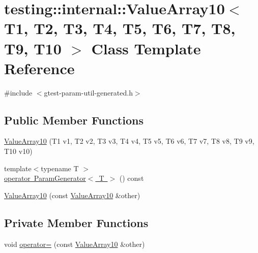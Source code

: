 \hypertarget{classtesting_1_1internal_1_1_value_array10}{}\section{testing\+::internal\+::Value\+Array10$<$ T1, T2, T3, T4, T5, T6, T7, T8, T9, T10 $>$ Class Template Reference}
\label{classtesting_1_1internal_1_1_value_array10}


{\ttfamily \#include $<$gtest-\/param-\/util-\/generated.\+h$>$}

\subsection*{Public Member Functions}
\begin{DoxyCompactItemize}
\item 
\mbox{\hyperlink{classtesting_1_1internal_1_1_value_array10_a763527165bcd1d8e7c366f979b76736b}{Value\+Array10}} (T1 v1, T2 v2, T3 v3, T4 v4, T5 v5, T6 v6, T7 v7, T8 v8, T9 v9, T10 v10)
\item 
{\footnotesize template$<$typename T $>$ }\\\mbox{\hyperlink{classtesting_1_1internal_1_1_value_array10_afa8855c713997ae82781159f3a3d53fc}{operator Param\+Generator$<$ T $>$}} () const
\item 
\mbox{\hyperlink{classtesting_1_1internal_1_1_value_array10_a05195c20e50321e51b2502c71c5ec8fa}{Value\+Array10}} (const \mbox{\hyperlink{classtesting_1_1internal_1_1_value_array10}{Value\+Array10}} \&other)
\end{DoxyCompactItemize}
\subsection*{Private Member Functions}
\begin{DoxyCompactItemize}
\item 
void \mbox{\hyperlink{classtesting_1_1internal_1_1_value_array10_acfd1de81f0fcbddc08cf0bb48f289b3e}{operator=}} (const \mbox{\hyperlink{classtesting_1_1internal_1_1_value_array10}{Value\+Array10}} \&other)
\end{DoxyCompactItemize}
